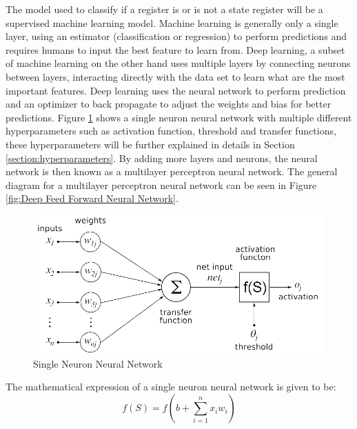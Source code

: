 \documentclass{tum-book}
\begin{document}
        \bigskip\noindent
        The model used to classify if a register is or is not a state register will be a supervised machine learning model. Machine learning is generally only a single layer, using an estimator (classification or regression) to perform predictions and requires humans to input the best feature to learn from. Deep learning, a subset of machine learning on the other hand uses multiple layers by connecting neurons between layers, interacting directly with the data set to learn what are the most important features. Deep learning uses the neural network to perform prediction and an optimizer to back propagate to adjust the weights and bias for better predictions. Figure \ref{fig:Single Neuron Neural Network} shows a single neuron neural network with multiple different hyperparameters such as activation function, threshold and transfer functions, these hyperparameters will be further explained in details in Section \ref{section:hyperparameters}. By adding more layers and neurons, the neural network is then known as a multilayer perceptron neural network. The general diagram for a multilayer perceptron neural network can be seen in Figure \ref{fig:Deep Feed Forward Neural Network}.

        \bigskip\begin{figure}[h]
            \centering
            \includegraphics[scale=0.5]{myFiles/myImages/Artificial_neural_network.png}
            \caption{Single Neuron Neural Network\cite{SingleNeuron}}
            \label{fig:Single Neuron Neural Network}
        \end{figure}

        \bigskip\noindent
        The mathematical expression of a single neuron neural network is given to be:
        \begin{equation}
        \label{eqn:n layers neural network}
        f(S)=f(b + \sum_{i=1}^{n} x_iw_i)
        \end{equation}
        
\end{document}
